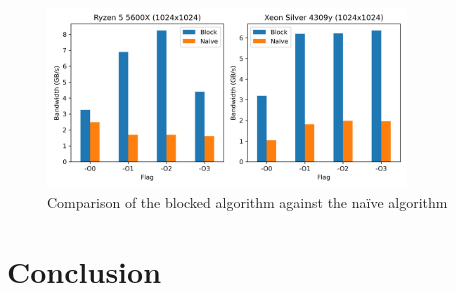 \documentclass{article}
\begin{document}
\begin{figure}[H]
    \centering
    \includegraphics[width=0.85\textwidth]{report/img/block_vs_naive.png}
    \caption{Comparison of the blocked algorithm against the na\"{i}ve algorithm}
    \label{fig:blocked_comparison}
\end{figure}
\section{Conclusion}
\end{document}
